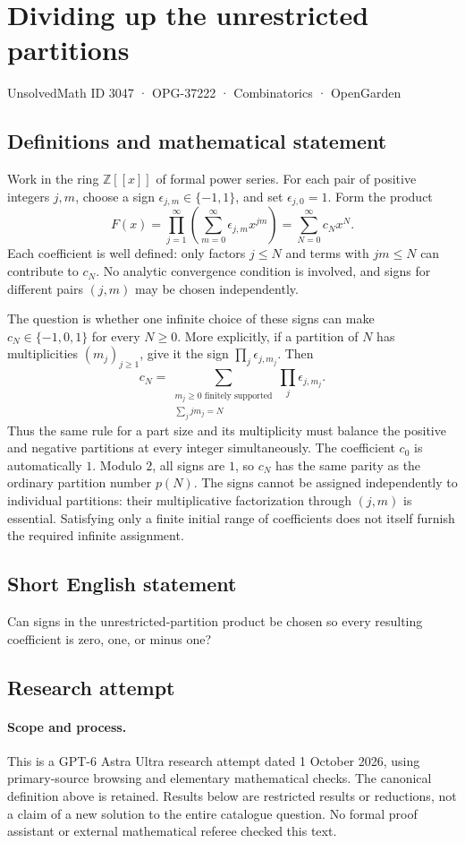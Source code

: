 \documentclass[11pt,a4paper]{article}
\begin{document}
\section*{Dividing up the unrestricted partitions}\label{3047}
{\small UnsolvedMath ID 3047 · OPG-37222 · Combinatorics · OpenGarden}
\subsection{Definitions and mathematical statement}
Work in the ring $\mathbb Z[[x]]$ of formal power series. For each pair
of positive integers $j,m$, choose a sign $\epsilon_{j,m}\in\{-1,1\}$,
and set $\epsilon_{j,0}=1$. Form the product
\[
 F(x)=\prod_{j=1}^{\infty}\left(\sum_{m=0}^{\infty}
                      \epsilon_{j,m}x^{jm}\right)
      =\sum_{N=0}^{\infty}c_Nx^N.
\]
Each coefficient is well defined: only factors $j\le N$ and terms with
$jm\le N$ can contribute to $c_N$. No analytic convergence condition is
involved, and signs for different pairs $(j,m)$ may be chosen independently.

The question is whether one infinite choice of these signs can make
$c_N\in\{-1,0,1\}$ for every $N\ge0$. More explicitly, if a partition
of $N$ has multiplicities $(m_j)_{j\ge1}$, give it the sign
$\prod_j\epsilon_{j,m_j}$. Then
\[
 c_N=\sum_{\substack{m_j\ge0\text{ finitely supported}\\
                       \sum_jjm_j=N}}\prod_j\epsilon_{j,m_j}.
\]
Thus the same rule for a part size and its multiplicity must balance the
positive and negative partitions at every integer simultaneously. The
coefficient $c_0$ is automatically $1$. Modulo $2$, all signs are $1$, so
$c_N$ has the same parity as the ordinary partition number $p(N)$.
The signs cannot be assigned independently to individual partitions:
their multiplicative factorization through $(j,m)$ is essential. Satisfying
only a finite initial range of coefficients does not itself furnish the
required infinite assignment.
\subsection{Short English statement}
Can signs in the unrestricted-partition product be chosen so every resulting coefficient is zero, one, or minus one?
\subsection{Research attempt}
\paragraph{Scope and process.}
This is a GPT-6 Astra Ultra research attempt dated 1 October 2026, using
primary-source browsing and elementary mathematical checks. The canonical
definition above is retained. Results below are restricted results or
reductions, not a claim of a new solution to the entire catalogue question.
No formal proof assistant or external mathematical referee checked this text.
\end{document}
